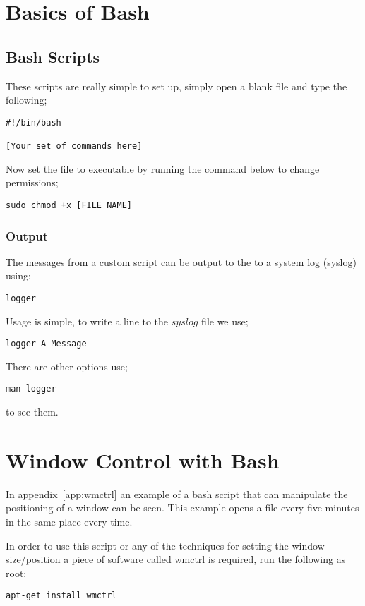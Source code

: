 \chapter{Basics of Bash}

\section{Bash Scripts}
\label{ssec:bash}

These scripts are really simple to set up, simply open a blank file and type the following;

\begin{lstlisting}
#!/bin/bash

[Your set of commands here]
\end{lstlisting}

Now set the file to executable by running the command below to change permissions;

\begin{lstlisting}
sudo chmod +x [FILE NAME]
\end{lstlisting}

\subsection{Output}

The messages from a custom script can be output to the to a system log (syslog) using;

\begin{lstlisting}
logger
\end{lstlisting}

Usage is simple, to write a line to the $syslog$ file we use;

\begin{lstlisting}
logger A Message
\end{lstlisting}

There are other options use;

\begin{lstlisting}
man logger
\end{lstlisting}

to see them.



\chapter{Window Control with Bash}

In appendix~\ref{app:wmctrl} an example of a bash script that can manipulate the positioning of a window can be seen.  This example opens a file every five minutes in the same place every time.

In order to use this script or any of the techniques for setting the window size/position a piece of software called wmctrl is required, run the following as root:

\begin{lstlisting}
apt-get install wmctrl
\end{lstlisting}